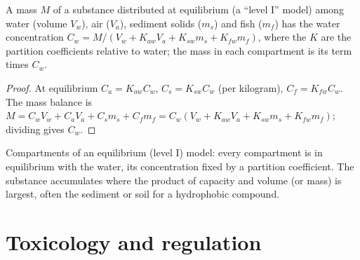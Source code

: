 \begin{proposition}\label{prop:b3:environmental-toxicology:level-one}
A mass $M$ of a substance distributed at equilibrium (a ``level I'' model) among water
(volume $V_w$), air ($V_a$), sediment solids ($m_s$) and fish ($m_f$) has the water concentration
$C_w = M/(V_w + K_{aw}V_a + K_{sw}m_s + K_{fw}m_f)$, where the $K$ are the partition coefficients relative to
water; the mass in each compartment is its term times $C_w$.
\end{proposition}

\begin{proof}
At equilibrium $C_a = K_{aw}C_w$, $C_s = K_{sw}C_w$ (per kilogram), $C_f = K_{fw}C_w$. The mass balance is
$M = C_wV_w + C_aV_a + C_sm_s + C_fm_f = C_w(V_w + K_{aw}V_a + K_{sw}m_s + K_{fw}m_f)$; dividing gives $C_w$.
\end{proof}

\begin{omfigure}

{\small Compartments of an equilibrium (level I) model: every compartment is in
equilibrium with the water, its concentration fixed by a partition coefficient.
The substance accumulates where the product of capacity and volume (or mass) is
largest, often the sediment or soil for a hydrophobic compound.}
\end{omfigure}

\section{Toxicology and regulation}


